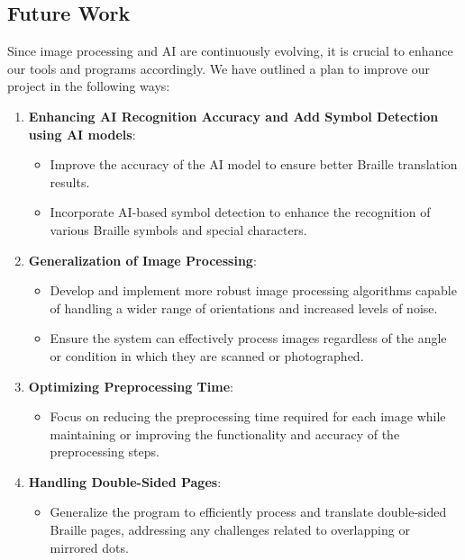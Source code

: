 \newpage

\subsection{Future Work}
\quad Since image processing and AI are continuously evolving, it is crucial to enhance our tools and programs accordingly. We have outlined a plan to improve our project in the following ways:
\begin{enumerate}
    \item \textbf{Enhancing AI Recognition Accuracy and Add Symbol Detection using AI models}:
    \begin{itemize}
        \item Improve the accuracy of the AI model to ensure better Braille translation results.
        \item Incorporate AI-based symbol detection to enhance the recognition of various Braille symbols and special characters.
    \end{itemize}
    
    \item \textbf{Generalization of Image Processing}:
    \begin{itemize}
        \item Develop and implement more robust image processing algorithms capable of handling a wider range of orientations and increased levels of noise.
        \item Ensure the system can effectively process images regardless of the angle or condition in which they are scanned or photographed.
    \end{itemize}
    
    \item \textbf{Optimizing Preprocessing Time}:
    \begin{itemize}
        \item Focus on reducing the preprocessing time required for each image while maintaining or improving the functionality and accuracy of the preprocessing steps.
    \end{itemize}
    
    \item \textbf{Handling Double-Sided Pages}:
    \begin{itemize}
        \item Generalize the program to efficiently process and translate double-sided Braille pages, addressing any challenges related to overlapping or mirrored dots.
    \end{itemize}
    

\end{enumerate}
